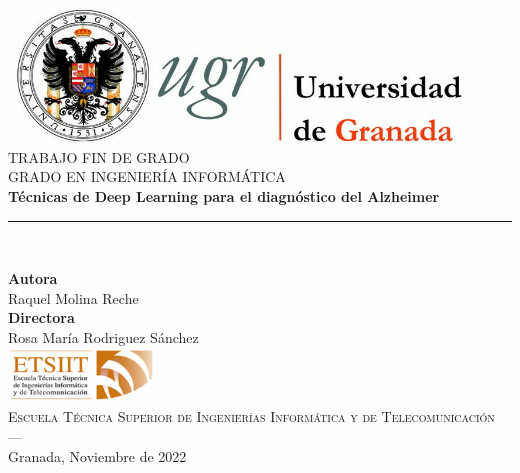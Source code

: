 \begin{titlepage}


\newlength{\centeroffset}
\setlength{\centeroffset}{-0.5\oddsidemargin}
\addtolength{\centeroffset}{0.5\evensidemargin}
\thispagestyle{empty}

\noindent\hspace*{\centeroffset}\begin{minipage}{\textwidth}

\centering
\includegraphics[width=0.9\textwidth]{logos/logo_ugr}\\[1.4cm]

\textsc{ \Large TRABAJO FIN DE GRADO\\[0.2cm]}
\textsc{ GRADO EN INGENIERÍA INFORMÁTICA}\\[1cm]
% 
{\Huge\bfseries Técnicas de Deep Learning para el diagnóstico del Alzheimer\\}
\noindent\rule[-1ex]{\textwidth}{3pt}\\[3.5ex]
\end{minipage}


\vspace{2.5cm}

\noindent\hspace*{\centeroffset}\begin{minipage}{\textwidth}
\thispagestyle{empty}
\centering

\textbf{Autora}\\ {Raquel Molina Reche}\\[2.5ex]
\textbf{Directora}\\ {Rosa María Rodriguez Sánchez}\\[2cm]
\includegraphics[width=0.3\textwidth]{logos/etsiit_logo}\\[0.1cm]
\textsc{Escuela Técnica Superior de Ingenierías Informática y de Telecomunicación}\\
\textsc{---}\\
Granada, Noviembre de 2022


\end{minipage}
\end{titlepage}



